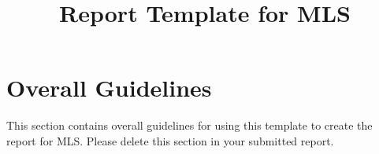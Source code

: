 \documentclass{article} %
\title{Report Template for MLS}
\begin{document}
\maketitle


\section*{Overall Guidelines}

This section contains overall guidelines for using this template to create the report for MLS. Please delete this section in your submitted report.
\end{document}

